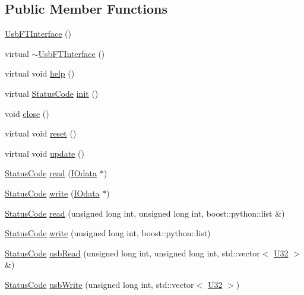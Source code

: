 \subsection*{Public Member Functions}
\begin{DoxyCompactItemize}
\item 
\hyperlink{classUsbFTInterface_aa0f871007821694c3e1f53f65cea8af4}{Usb\+F\+T\+Interface} ()
\item 
virtual \hyperlink{classUsbFTInterface_ad1fb563d0ff5f76aa833d02e65d4204a}{$\sim$\+Usb\+F\+T\+Interface} ()
\item 
virtual void \hyperlink{classUsbFTInterface_a91a0046390c76ca8abaa330fa244279c}{help} ()
\item 
virtual \hyperlink{classStatusCode}{Status\+Code} \hyperlink{classUsbFTInterface_a5371fe7b447850599eaec81a0ffa2ba0}{init} ()
\item 
void \hyperlink{classUsbFTInterface_ad555e20eb4b80da1d3cac5a8c6509bb5}{close} ()
\item 
virtual void \hyperlink{classUsbFTInterface_a7bd95c22da69daeaad7f752f560740f4}{reset} ()
\item 
virtual void \hyperlink{classUsbFTInterface_a6adc58a50696c9b3268e84c291901ce7}{update} ()
\item 
\hyperlink{classStatusCode}{Status\+Code} \hyperlink{classUsbFTInterface_ab9daafce1d7878b95ba0655a570922e2}{read} (\hyperlink{classIOdata}{I\+Odata} $\ast$)
\item 
\hyperlink{classStatusCode}{Status\+Code} \hyperlink{classUsbFTInterface_a059296c0d7e5118f975f1dfa2e1f3fbb}{write} (\hyperlink{classIOdata}{I\+Odata} $\ast$)
\item 
\hyperlink{classStatusCode}{Status\+Code} \hyperlink{classUsbFTInterface_a682e63cb6168be314aa3cc6e6a10ec59}{read} (unsigned long int, unsigned long int, boost\+::python\+::list \&)
\item 
\hyperlink{classStatusCode}{Status\+Code} \hyperlink{classUsbFTInterface_a2efbde3a31cdbe44a3cbd66da6592870}{write} (unsigned long int, boost\+::python\+::list)
\item 
\hyperlink{classStatusCode}{Status\+Code} \hyperlink{classUsbFTInterface_adb38dfafa3946dd373585e596851b6e6}{usb\+Read} (unsigned long int, unsigned long int, std\+::vector$<$ \hyperlink{classUsbFTInterface_aee2201fe4d977aa03568fa8dbacc39ba}{U32} $>$ \&)
\item 
\hyperlink{classStatusCode}{Status\+Code} \hyperlink{classUsbFTInterface_ab7bf021f1fa3af385234e639c84827ef}{usb\+Write} (unsigned long int, std\+::vector$<$ \hyperlink{classUsbFTInterface_aee2201fe4d977aa03568fa8dbacc39ba}{U32} $>$)

\end{DoxyCompactItemize}
